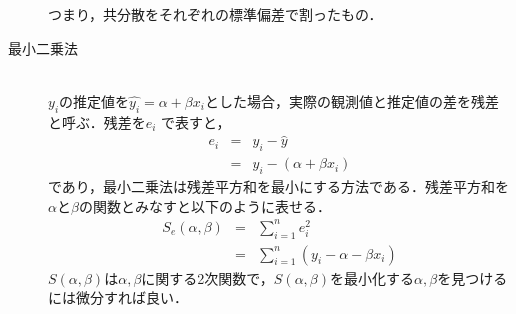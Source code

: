 \documentclass[a4paper,10pt,fleqn]{jarticle}
\begin{document}
\begin{description}
つまり，共分散をそれぞれの標準偏差で割ったもの．
\item[最小二乗法]\mbox{}\\
$y_i$の推定値を$\hat{y_i}=\alpha+\beta x_i$とした場合，実際の観測値と推定値の差を残差と呼ぶ．残差を$e_i$
で表すと，
\begin{eqnarray*}
e_i&=&y_i-\hat{y}\\
&=&y_i-\left( \alpha+\beta x_i \right)
\end{eqnarray*}
であり，最小二乗法は残差平方和を最小にする方法である．残差平方和を$\alpha$と$\beta$の関数とみなすと以下のように表せる．
\begin{eqnarray*}
S_e(\alpha,\beta)&=&\sum \limits ^n _{i=1}e_i ^2\\
&=&\sum \limits ^n _{i=1}\left( y_i-\alpha-\beta x_i \right)
\end{eqnarray*}
$S(\alpha,\beta)$は$\alpha,\beta$に関する2次関数で，$S(\alpha,\beta)$を最小化する$\alpha,\beta$を見つけるには微分すれば良い．


\end{description}
\end{document}

